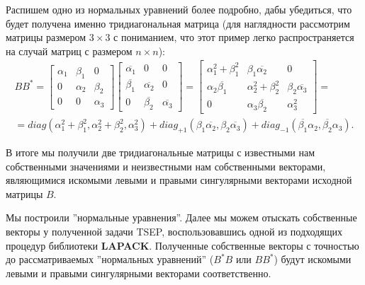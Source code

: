 Распишем одно из нормальных уравнений более подробно, дабы убедиться, что будет получена именно тридиагональная матрица (для наглядности рассмотрим матрицы размером $3\times 3$ с пониманием, что этот пример легко распространяется на случай матриц с размером $n\times n$):
\begin{equation*}
    \begin{split}
        BB^*=\begin{bmatrix}
            \alpha_1 & \beta_1 & 0\\
            0 & \alpha_2 & \beta_2 \\
            0 & 0 & \alpha_3  
        \end{bmatrix}\begin{bmatrix}
            \overline{\alpha_1} & 0 & 0\\
            \overline{\beta_1} & \overline{\alpha_2} & 0 \\
            0 & \overline{\beta_2} & \overline{\alpha_3}  
        \end{bmatrix} =
        \begin{bmatrix}
            \alpha_1^2+\beta^2_1 & \beta_1 \overline{\alpha_2} & 0 \\
            \alpha_2 \overline{\beta_1} & \alpha_2^2+\beta_2^2 & \beta_2 \overline{\alpha_3} \\
            0 & \alpha_3 \overline{\beta_2} & \alpha_3^2
        \end{bmatrix} =\\[6pt]= diag(\alpha_1^2+\beta^2_1, \alpha_2^2+\beta^2_2,\alpha_3^2)+diag_{+1}(\beta_1 \overline{\alpha_2},\beta_2 \overline{\alpha_3})+diag_{-1}(\overline{\beta_1} \alpha_2,\overline{\beta_2} \alpha_3).
    \end{split}
\end{equation*}

В итоге мы получили две тридиагональные матрицы с известными нам собственными значениями и неизвестными нам собственными векторами, являющимися искомыми левыми и правыми сингулярными векторами исходной матрицы $B$.

Мы построили ''нормальные уравнения''. Далее мы можем отыскать собственные векторы у полученной задачи TSEP, воспользовавшись одной из подходящих процедур библиотеки \textbf{LAPACK}. Полученные собственные векторы с точностью до рассматриваемых ''нормальных уравнений'' (\(B^*B\) или \(BB^*\)) будут искомыми левыми и правыми сингулярными векторами соответственно.

